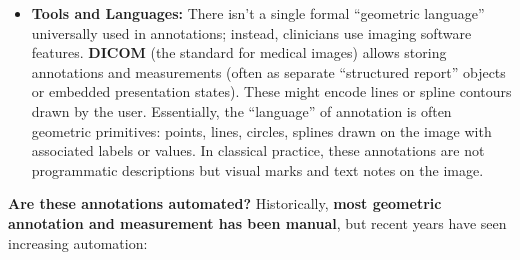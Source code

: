 \documentclass[
]{article}
\begin{document}
\begin{itemize}
  is tedious and requires years of training.
\item
  \textbf{Tools and Languages:} There isn't a single formal ``geometric
  language'' universally used in annotations; instead, clinicians use
  imaging software features. \textbf{DICOM} (the standard for medical
  images) allows storing annotations and measurements (often as separate
  ``structured report'' objects or embedded presentation states). These
  might encode lines or spline contours drawn by the user. Essentially,
  the ``language'' of annotation is often geometric primitives: points,
  lines, circles, splines drawn on the image with associated labels or
  values. In classical practice, these annotations are not programmatic
  descriptions but visual marks and text notes on the image.
\end{itemize}

\textbf{Are these annotations automated?} Historically, \textbf{most
geometric annotation and measurement has been manual}, but recent years
have seen increasing automation:
\end{document}
